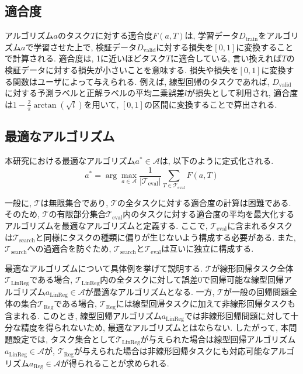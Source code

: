\documentclass[11pt,oneside,openany,report]{jsbook}
\begin{document}
\subsection{適合度} \label{subsec:problem:definition:fitness}

アルゴリズム$a$のタスク$T$に対する適合度$F(a, T)$は, 学習データ$D_\mathrm{train}$をアルゴリズム$a$で学習させた上で, 検証データ$D_\mathrm{valid}$に対する損失を$[0,1]$に変換することで計算される. 適合度は, 1に近いほどタスク$T$に適合している, 言い換えれば$T$の検証データに対する損失が小さいことを意味する. 損失や損失を$[0,1]$に変換する関数はユーザによって与えられる. 例えば, 線型回帰のタスクであれば, $D_\mathrm{valid}$に対する予測ラベルと正解ラベルの平均二乗誤差$l$が損失として利用され, 適合度は$1-\frac{2}{\pi} \arctan\left(\sqrt{l}\right)$を用いて, $[0,1]$の区間に変換することで算出される.

\subsection{最適なアルゴリズム}\label{subsec:problem:definition:optimum}

本研究における最適なアルゴリズム$a^\ast \in \mathcal{A}$は, 以下のように定式化される.
\begin{equation}
\label{eq:optimum}
a^\ast =  \arg \max_{a \in \mathcal{A}} \frac{1}{|\mathcal{T}_\mathrm{eval}|} \sum_{T \in \mathcal{T}_\mathrm{eval}} F(a, T)
\end{equation}

\noindent
一般に, $\mathcal{T}$は無限集合であり, $\mathcal{T}$の全タスクに対する適合度の計算は困難である. そのため, $\mathcal{T}$の有限部分集合$\mathcal{T}_\mathrm{eval}$内のタスクに対する適合度の平均を最大化するアルゴリズムを最適なアルゴリズムと定義する. ここで, $\mathcal{T}_\mathrm{eval}$に含まれるタスクは$\mathcal{T}_\mathrm{search}$と同様にタスクの種類に偏りが生じないよう構成する必要がある. また, $\mathcal{T}_\mathrm{search}$への過適合を防ぐため, $\mathcal{T}_\mathrm{search}$と$\mathcal{T}_\mathrm{eval}$は互いに独立に構成する.

最適なアルゴリズムについて具体例を挙げて説明する. $\mathcal{T}$が線形回帰タスク全体$\mathcal{T}_\mathrm{LinReg}$である場合, $\mathcal{T}_\mathrm{LinReg}$内の全タスクに対して誤差0で回帰可能な線型回帰アルゴリズム$a_\mathrm{LinReg} \in \mathcal{A}$が最適なアルゴリズムとなる. 一方, $\mathcal{T}$が一般の回帰問題全体の集合$\mathcal{T}_\mathrm{Reg}$である場合, $\mathcal{T}_\mathrm{Reg}$には線型回帰タスクに加えて非線形回帰タスクも含まれる. このとき, 線型回帰アルゴリズム$a_\mathrm{LinReg}$では非線形回帰問題に対して十分な精度を得られないため, 最適なアルゴリズムとはならない. したがって, 本問題設定では, タスク集合として$\mathcal{T}_\mathrm{LinReg}$が与えられた場合は線型回帰アルゴリズム$a_\mathrm{LinReg}\in \mathcal{A}$が, $\mathcal{T}_\mathrm{Reg}$が与えられた場合は非線形回帰タスクにも対応可能なアルゴリズム$a_\mathrm{Reg}\in \mathcal{A}$が得られることが求められる.
\end{document}
